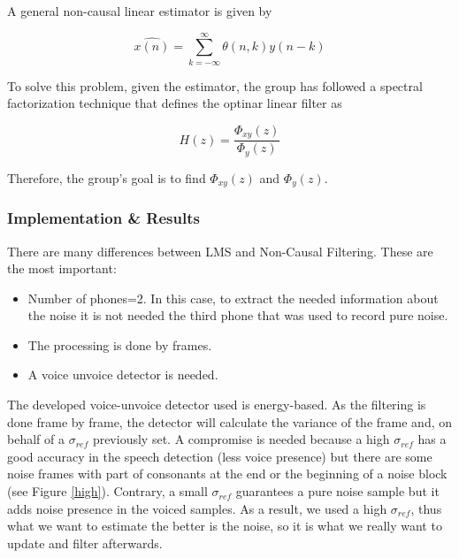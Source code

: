 \documentclass[11pt,a4paper,spanish]{book}  %
\theoremstyle{definition}  %
\theoremstyle{plain}  %
\theoremstyle{remark}  %
\begin{document}
	A general non-causal linear estimator is given by 
	
	
	\begin{equation}
	\label{eq:nonc1}
		\hat{x(n)} = \sum \limits_{k=-\infty}^\infty \theta(n,k)y(n-k)
	\end{equation}
	
	To solve this problem, given the estimator, the group has followed a spectral factorization technique that defines the optinar linear filter as
	
		\begin{equation}
	\label{eq:nonc1}
		H(z)=\frac{\Phi_{xy}(z)}{\Phi_{y}(z)}
	\end{equation}
	
	Therefore, the group's goal is to find $\Phi_{xy}(z)$ and $\Phi_{y}(z)$.
	
	
	\subsubsection{Implementation \& Results}
	
		There are many differences between LMS and Non-Causal Filtering. These are the most important:
		
		\begin{itemize}
		\item Number of phones=2. In this case, to extract the needed information about the noise it is not needed the third phone that was used to record pure noise.
		
		\item The processing is done by frames.
		
		\item A voice unvoice detector is needed.
		\end{itemize}
		
		The developed voice-unvoice detector used is energy-based. As the filtering is done frame by frame, the detector will calculate the variance of the frame and, on behalf of a $\sigma_{ref}$ previously set. A compromise is needed because a high $\sigma_{ref}$ has a good accuracy in the speech detection (less voice presence) but there are some noise frames with part of consonants at the end or the beginning of a noise block (see Figure \ref{high}). Contrary, a small $\sigma_{ref}$ guarantees a pure noise sample but it adds noise presence in the voiced samples. As a result, we used a high $\sigma_{ref}$, thus what we want to estimate the better is the noise, so it is what we really want to update and filter afterwards. 
		
\end{document}
